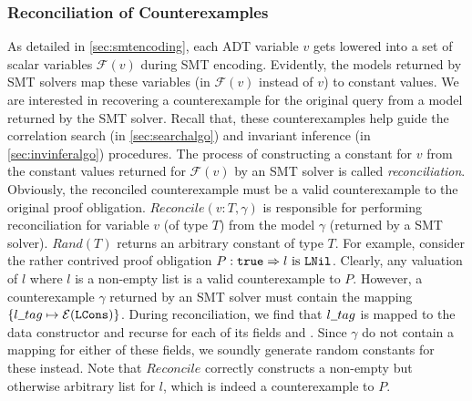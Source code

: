 \subsubsection{Reconciliation of Counterexamples}
\label{sec:cerecons}
As detailed in \cref{sec:smtencoding}, each ADT variable $v$ gets lowered into a set of scalar
variables $\mathcal{F}(v)$ during SMT encoding.
Evidently, the models returned by SMT solvers map these variables (in $\mathcal{F}(v)$ instead of $v$)
to constant values.
We are interested in recovering a counterexample for the original query from a
model returned by the SMT solver.
Recall that, these counterexamples help guide the correlation search (in \cref{sec:searchalgo})
and invariant inference (in \cref{sec:invinferalgo}) procedures.
The process of constructing a constant for $v$ from the constant values returned for $\mathcal{F}(v)$
by an SMT solver is called {\em reconciliation}.
Obviously, the reconciled counterexample must be a valid counterexample to the original proof obligation.
$Reconcile(v:T, \gamma)$ is responsible for performing reconciliation for variable $v$ (of type $T$)
from the model $\gamma$ (returned by a SMT solver).
$Rand(T)$ returns an arbitrary constant of type $T$.
For example, consider the rather contrived proof obligation $P: {\tt true} \Rightarrow l\ \mathrm{is}\ {\tt {\tt LNil}}$.
Clearly, any valuation of $l$ where $l$ is a non-empty list is a valid counterexample to $P$.
However, a counterexample $\gamma$ returned by an SMT solver must contain
the mapping $\{ l \strsep{} tag \mapsto \mathcal{E}(\cons{LCons}) \}$.
During reconciliation, we find that $l \strsep{} tag$ is mapped to the data constructor 
and recurse for each of its fields  and .
Since $\gamma$ do not contain a mapping for either of these fields, we soundly generate random constants
for these instead.
Note that $Reconcile$ correctly constructs a non-empty but otherwise arbitrary list for $l$, which
is indeed a counterexample to $P$.


